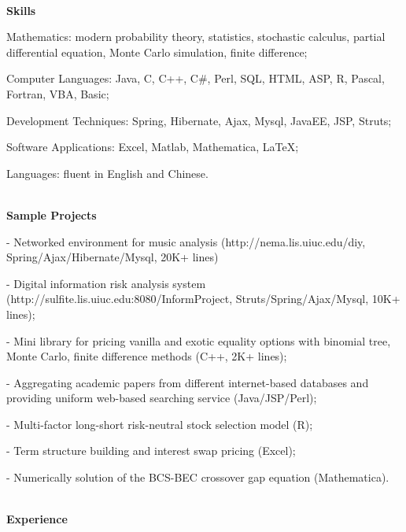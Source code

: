 \documentclass[10pt]{article}
\begin{document}
\hrulefill\\
\vspace{0.12in}
{\large \textbf{Skills}}

\begin{description*}
\item[Mathematics:]
modern probability theory, statistics, stochastic calculus, partial differential equation, Monte Carlo simulation,  finite difference;  
\item[Computer Languages:]
 Java, C, C++, C\#, Perl, SQL, HTML,  ASP,  R, Pascal,  Fortran, VBA, Basic;
 \item[Development Techniques:]
Spring, Hibernate, Ajax, Mysql, JavaEE,  JSP, Struts;
\item[Software Applications:]
Excel,  Matlab, Mathematica, \LaTeX;
\item[Languages:]
fluent in English and Chinese.

\end{description*}
\hrulefill\\
\vspace{0.12in}
{\large \textbf{Sample Projects}}

\begin{itemize*}
\item[-] Networked environment for music analysis ({http://nema.lis.uiuc.edu/diy}, Spring/Ajax/Hibernate/Mysql, 20K+ lines)
\item[-] Digital information risk analysis system ({http://sulfite.lis.uiuc.edu:8080/InformProject}, Struts/Spring/Ajax/Mysql, 10K+ lines);
\item[-] Mini library for pricing vanilla and exotic equality options with binomial tree, Monte Carlo, finite difference methods (C++, 2K+ lines);
\item[-] Aggregating academic papers from different internet-based databases and providing uniform web-based searching service (Java/JSP/Perl);
\item[-] Multi-factor long-short risk-neutral stock selection model (R);
\item[-] Term structure building and interest swap pricing (Excel); 
\item[-] Numerically solution of the BCS-BEC crossover gap equation (Mathematica).
\end{itemize*}
\hrulefill\\
\vspace{0.12in}
{\large \textbf{Experience}}
\end{document}

